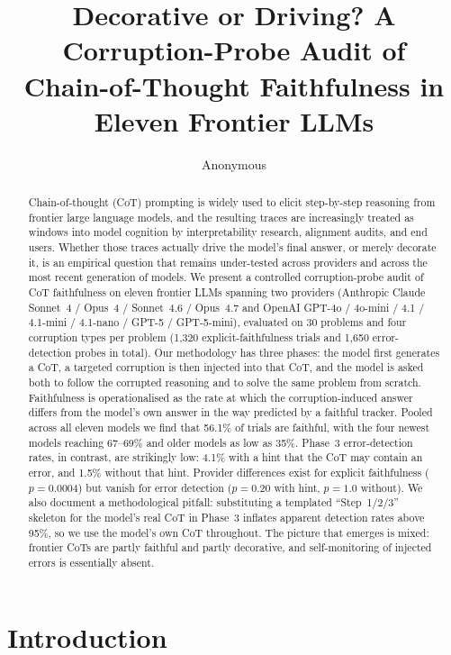 \documentclass[11pt]{article}
\title{Decorative or Driving? A Corruption-Probe Audit of\\ Chain-of-Thought Faithfulness in Eleven Frontier LLMs}
\author{Anonymous}
\affil{Anonymous Institution}
\date{}
\begin{document}
\maketitle

\begin{abstract}
Chain-of-thought (CoT) prompting is widely used to elicit step-by-step reasoning from frontier large language models, and the resulting traces are increasingly treated as windows into model cognition by interpretability research, alignment audits, and end users. Whether those traces actually drive the model's final answer, or merely decorate it, is an empirical question that remains under-tested across providers and across the most recent generation of models. We present a controlled corruption-probe audit of CoT faithfulness on eleven frontier LLMs spanning two providers (Anthropic Claude Sonnet~4 / Opus~4 / Sonnet~4.6 / Opus~4.7 and OpenAI GPT-4o / 4o-mini / 4.1 / 4.1-mini / 4.1-nano / GPT-5 / GPT-5-mini), evaluated on 30 problems and four corruption types per problem (1{,}320 explicit-faithfulness trials and 1{,}650 error-detection probes in total). Our methodology has three phases: the model first generates a CoT, a targeted corruption is then injected into that CoT, and the model is asked both to follow the corrupted reasoning and to solve the same problem from scratch. Faithfulness is operationalised as the rate at which the corruption-induced answer differs from the model's own answer in the way predicted by a faithful tracker. Pooled across all eleven models we find that 56.1\% of trials are faithful, with the four newest models reaching 67--69\% and older models as low as 35\%. Phase~3 error-detection rates, in contrast, are strikingly low: 4.1\% with a hint that the CoT may contain an error, and 1.5\% without that hint. Provider differences exist for explicit faithfulness ($p=0.0004$) but vanish for error detection ($p=0.20$ with hint, $p=1.0$ without). We also document a methodological pitfall: substituting a templated ``Step~1/2/3'' skeleton for the model's real CoT in Phase~3 inflates apparent detection rates above 95\%, so we use the model's own CoT throughout. The picture that emerges is mixed: frontier CoTs are partly faithful and partly decorative, and self-monitoring of injected errors is essentially absent.
\end{abstract}

\section{Introduction}
\end{document}
